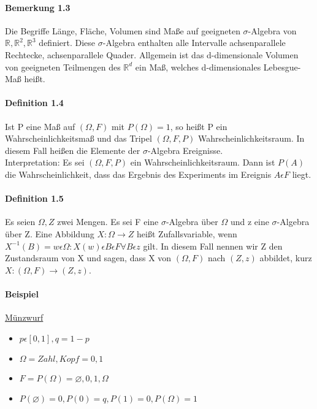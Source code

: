 \documentclass[paper=a4, fontsize=11pt]{scrartcl}
\numberwithin{equation}{section}
\numberwithin{figure}{section}
\numberwithin{table}{section}
\begin{document}
\paragraph{Bemerkung 1.3}
Die Begriffe Länge, Fläche, Volumen sind Maße auf geeigneten $\sigma$-Algebra von $ \mathbb{R}, \mathbb{R}^{2} , \mathbb{R}^{3}$ definiert. Diese $\sigma$-Algebra enthalten alle Intervalle achsenparallele Rechtecke, achsenparallele Quader. Allgemein ist das d-dimensionale Volumen von geeigneten Teilmengen des $\mathbb{R}^{d}$ ein Maß, welches d-dimensionales Lebesgue-Maß heißt.

\paragraph{Definition 1.4}
Ist P eine Maß auf $(\Omega, F)$ mit $P (\Omega) = 1$, so heißt P ein Wahrscheinlichkeitsmaß und das Tripel $(\Omega, F, P)$ Wahrscheinlichkeitsraum. In diesem Fall heißen die Elemente der $\sigma$-Algebra Ereignisse. \\

Interpretation: Es sei $(\Omega, F, P)$ ein Wahrscheinlichkeitsraum. Dann ist $P (A)$ die Wahrscheinlichkeit, dass das Ergebnis des Experiments im Ereignis $A \epsilon F$ liegt.

\paragraph{Definition 1.5}
Es seien $\Omega , Z$ zwei Mengen. Es sei F eine $\sigma$-Algebra über $\Omega$ und z eine $\sigma$-Algebra über Z. Eine Abbildung $X: \Omega \rightarrow Z$ heißt Zufallsvariable, wenn $X^{-1}(B)= {w \epsilon \Omega: X(w) \epsilon B} \epsilon F \forall B \epsilon z$ gilt. In diesem Fall nennen wir Z den Zustandsraum von X und sagen, dass X von $(\Omega, F)$ nach $(Z,z)$ abbildet, kurz $X:(\Omega, F) \rightarrow (Z,z)$.

\paragraph{Beispiel}
\underline{Münzwurf}
\begin{itemize}
\item $p \epsilon [0,1], q = 1-p$
\item $\Omega={Zahl, Kopf}={0,1}$
\item $F = P (\Omega) = { \varnothing, {0}, {1}, \Omega}$
\item $P (\varnothing) = 0, P ({0}) = q, P({1}) = 0, P(\Omega) = 1$
\end{itemize}
\end{document}
